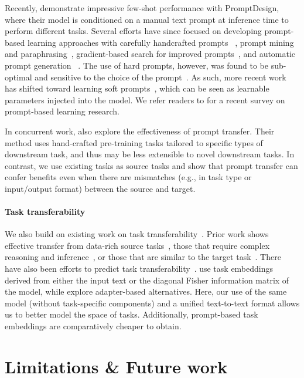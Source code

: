 Recently, \citet{TBrown20} demonstrate impressive few-shot performance with {\small \sc PromptDesign}, where their model is conditioned on a manual text prompt at inference time to perform different tasks. Several efforts have since focused on developing prompt-based learning approaches with carefully handcrafted prompts~\cite{TSchick20} , prompt mining and paraphrasing~\cite{ZJiang20}, gradient-based search for improved prompts~\cite{TShin20}, and automatic prompt generation ~\cite{TGao21}. The use of hard prompts, however, was found to be sub-optimal and sensitive to the choice of the prompt~\cite{TZhao21,XLiu21}. As such, more recent work has shifted toward learning soft prompts~\cite{XLiu21,GQin21,XLi21,BLester21}, which can be seen as learnable parameters injected into the model. We refer readers to \citet{PLiu21} for a recent survey on prompt-based learning research. 

In concurrent work, \citet{YGu21} also explore the effectiveness of prompt transfer. Their method uses hand-crafted pre-training tasks tailored to specific types of downstream task, and thus may be less extensible to novel downstream tasks. In contrast, we use existing tasks as source tasks and show that prompt transfer can confer benefits even when there are mismatches (e.g., in task type or input/output format) between the source and target. 
\paragraph{Task transferability} We also build on existing work on task transferability~\cite{AWang19c,NLiu19,ATalmor19,YPruksachatkun20,TVu20,TVu21}. Prior work shows effective transfer from data-rich source tasks~\cite{JPhang19}, those that require complex reasoning and inference~\cite{YPruksachatkun20}, or those that are similar to the target task~\cite{TVu20}. There have also been efforts to predict task transferability~\cite{JBingel17,TVu20,CPoth21}. \citet{TVu20} use task embeddings derived from either the input text or the diagonal Fisher information matrix of the model, while \citet{CPoth21} explore adapter-based alternatives. Here, our use of the same model (without task-specific components) and a unified text-to-text format allows us to better model the space of tasks. Additionally, prompt-based task embeddings are comparatively cheaper to obtain. 

\section{Limitations \& Future work}

